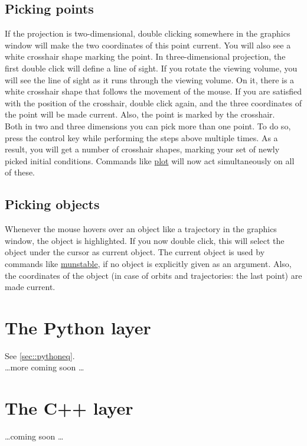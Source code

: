 \documentclass[10pt,a4paper,titlepage]{article}
\newcommand{\HL}[1]{\hyperlink{#1}{#1}}
\begin{document}
\subsection{Picking points}
If the projection is two-dimensional, double clicking somewhere in the graphics window will make the two coordinates of this point current. You will also see a white crosshair shape marking the point. In three-dimensional projection, the first double click will define a line of sight. If you rotate the viewing volume, you will see the line of sight as it runs through the viewing volume. On it, there is a white crosshair shape that follows the movement of the mouse. If you are satisfied with the position of the crosshair, double click again, and the three coordinates of the point will be made current. Also, the point is marked by the crosshair.\\
Both in two and three dimensions you can pick more than one point. To do so, press the control key while performing the steps above multiple times. As a result, you will get a number of crosshair shapes, marking your set of newly picked initial conditions. Commands like \HL{plot} will now act simultaneously on all of these.
\subsection{Picking objects}
Whenever the mouse hovers over an object like a trajectory in the graphics window, the object is highlighted. If you now double click, this will select the object under the cursor as current object. The current object is used by commands like \HL{munstable}, if no object is explicitly given as an argument. Also, the coordinates of the object (in case of orbits and trajectories: the last point) are made current.
\newpage\section{The Python layer}
See \ref{sec::pythoneq}.\\
\ldots more coming soon \ldots
\section{The C++ layer}
\ldots coming soon \ldots

\printindex*
\end{document}

